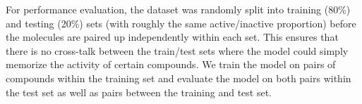 
For performance evaluation, the dataset was randomly split into training (80\%) and testing (20\%) sets (with roughly the same active/inactive proportion) before the molecules are paired up independently within each set. This ensures that there is no cross-talk between the train/test sets where the model could simply memorize the activity of certain compounds. We train the model on pairs of compounds within the training set and evaluate the model on both pairs within the test set as well as pairs between the training and test set.

